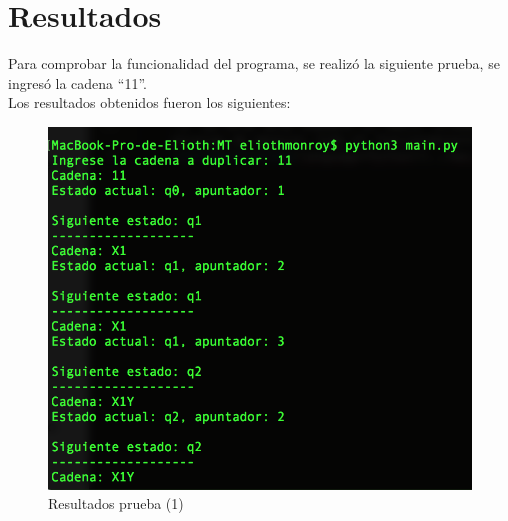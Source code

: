\section{Resultados}
	Para comprobar la funcionalidad del programa, se realizó la siguiente prueba, se ingresó la cadena ``11''.\\
	Los resultados obtenidos fueron los siguientes:
	\begin{figure}[H]
		\begin{center}
			\includegraphics[scale=.6]{img/prueba1.png}
			\caption{Resultados prueba (1)}
			\label{fig:maquin2}
		\end{center}
	\end{figure}
